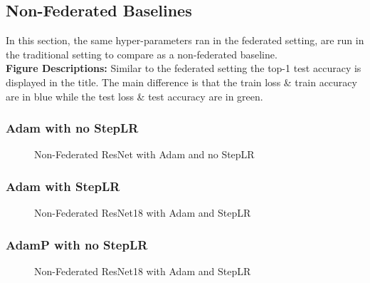 \subsection{Non-Federated Baselines}
In this section, the same hyper-parameters ran in the federated setting, are run in the traditional setting to compare as a non-federated baseline. \\

\textbf{Figure Descriptions:} Similar to the federated setting the top-1 test accuracy is displayed in the title. The main difference is that the train loss \& train accuracy are in blue while the test loss \& test accuracy are in green. 
\subsubsection{Adam with no StepLR}
\begin{figure}[H]
    \centering
    \hspace{-0.80cm}
    \caption{Non-Federated ResNet with Adam and no StepLR}
    \label{fig:normal-adam-nosteplr}
\end{figure}

\subsubsection{Adam with StepLR}
\begin{figure}[H]
    \centering
    \hspace{-0.80cm}
    \caption{Non-Federated ResNet18 with Adam and StepLR}
    \label{fig:normal-adam-steplr}
\end{figure}

\subsubsection{AdamP with no StepLR}
\begin{figure}[H]
    \centering
    \hspace{-0.80cm}
    \caption{Non-Federated ResNet18 with Adam and StepLR}
    \label{fig:normal-adamp-nosteplr}
\end{figure}

